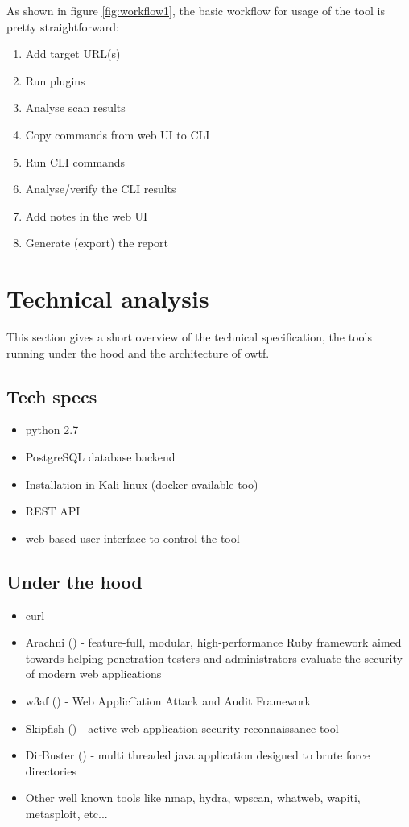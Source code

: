 As shown in figure \ref{fig:workflow1}, the basic workflow for usage of the tool is pretty straightforward:

\begin{enumerate}
	\item Add target URL(s)
	\item Run plugins
	\item Analyse scan results
	\item Copy commands from web UI to CLI
	\item Run CLI commands
	\item Analyse/verify the CLI results
	\item Add notes in the web UI
	\item Generate (export) the report
\end{enumerate}


\section{Technical analysis}

This section gives a short overview of the technical specification, the tools running under the hood and the architecture of \ac{owtf}.

\subsection{Tech specs}

\begin{itemize}
	\item python 2.7
	\item PostgreSQL database backend
	\item Installation in Kali linux (docker available too)
	\item REST API
	\item web based user interface to control the tool
\end{itemize}

\subsection{Under the hood}

\begin{itemize}
	\item curl
	\item Arachni (\cite{Arachni.11.06.2021}) - feature-full, modular, high-performance Ruby framework aimed towards helping penetration testers and administrators evaluate the security of modern web applications
	\item w3af (\cite{WAF.11.06.2021}) - Web Applic^ation Attack and Audit Framework
	\item Skipfish (\cite{Skipfish.11.06.2021}) - active web application security reconnaissance tool
	\item DirBuster (\cite{DirBuster.11.06.2021}) - multi threaded java application designed to brute force directories
	\item Other well known tools like nmap, hydra, wpscan, whatweb, wapiti, metasploit, etc...
\end{itemize}

